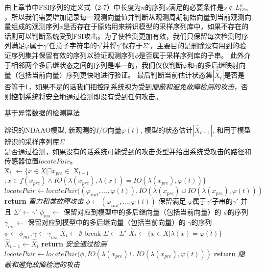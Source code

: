 由上章节中FSI序列的定义式（2-7）中长度为$n$的序列$s$满足的必要条件是$s\notin L_{Obs}^n$，所以我们需要增加记录每一观测向量值并判断从观测周期初始向量到当前观测向量组成的观测序列$\phi$是否存在于原始用来辨识模型的采样序列库中，如果不存在的话则可以判断系统受到FSI攻击。为了使检测更加有效，我们只保留每次检测时序列满足$ \varphi$属于$\gamma'$任意子字符串的$\gamma'$并将$\gamma'$保存于$\varSigma'$，主要目的是删除没有用到的验证序列集并保留有效的序列以验证观测序列$\phi$是否属于采样序列库的子串。 此外介于相邻两个多后继状态之间的序列是唯一的，我们仅仅判断$ \varphi $和$ \gamma $的多后继映射向量（包括当前向量）序列更快地进行验证。 最后判断当前估计状态集$|\hat{X}_{t}|$是否是否等于1，如果不是的话我们把控制系统视为受到\textit {隐蔽和避免故障检测的攻击}，否则控制系统将安全地通过检测即没有受到任何攻击。

\begin{algorithm}[h]
		\caption{基于异常数据的检测算法}
		\label{algo:abd}
		\begin{algorithmic}[1]
			\Require %
			辨识的NDAAO模型, 新观测的$I/O$向量$\varphi(t)$, 模型的状态估计$|\hat{X}_{t-1}|$, 和用于模型辨识的采样序列库$\varSigma$ \\  
			\Ensure %
			是否通过检测，如果没有的话系统可能受到的攻击类型并给出系统受攻击的路径和传感器位置$locatePair$。 \\
			\State \^{X}$_{t}$ $\leftarrow \{x\in X|\exists x_{pre}\in$ \^{X}$_{t-1}$$:x\in f(x_{pre}) \wedge IO(\lambda(x_{pre}),\lambda(x))=IO(\lambda(x_{pre}),\varphi(t))\}$
			\State $locatePair\leftarrow locatePair((\varphi_{init},...,\varphi(t)),IO(\lambda(x_{pre})\cup IO(\lambda(x_{pre}),\varphi(t)))$
			\State \textbf{return} \textit{蛮力和类故障攻击}
			\EndIf
			\State $\phi \leftarrow (\varphi_{init},...,\varphi(t))$
			\State 保留满足 $\varphi 属于\gamma'$子串的$\gamma'$ 并且 $\varSigma' \leftarrow \gamma'$
			\State $\phi_{ms} \leftarrow$ 保留对应到模型中的多后继向量（包括当前向量）的 $\phi$的序列
			\State $\gamma_{ms} \leftarrow$ 保留对应到模型中的多后继向量（包括当前向量）的 $\gamma$的序列
			\State $\phi\leftarrow \phi_{ms}, \gamma\leftarrow \gamma_{ms}$
			\State $\hat{X}_t \leftarrow \emptyset$
			\State break
			\EndIf
			\EndFor
			$\varSigma \leftarrow \varSigma'$
			\EndIf
			\Else
			\State $\hat{X}_t \leftarrow \{x\in X|\lambda(x)=\varphi(t)\}$
			\EndIf
			$\hat{X}_{t-1}\leftarrow \hat{X}_t$
			\State \textbf{return} \textit{安全通过检测}
			\Else
			\State $locatePair\leftarrow locatePair(\phi,IO(\lambda(x_{pre})\cup
			IO(\lambda(x_{pre}),\varphi(t)))$
			\State \textbf{return} \textit{隐蔽和避免故障检测的攻击}
			\EndIf
		\end{algorithmic}
	\end{algorithm}

